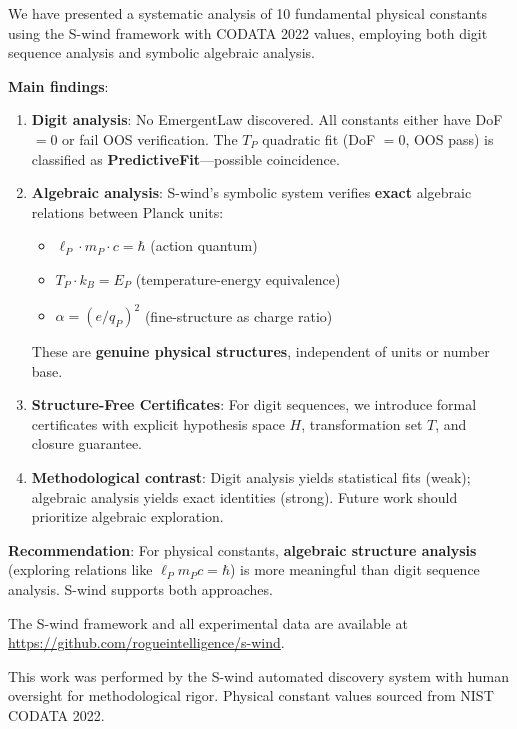 \documentclass[twocolumn,showpacs,preprintnumbers,amsmath,amssymb,prl]{revtex4-2}
\begin{document}
We have presented a systematic analysis of 10 fundamental physical constants using the S-wind framework with CODATA 2022 values, employing both digit sequence analysis and symbolic algebraic analysis.

\textbf{Main findings}:

\begin{enumerate}
    \item \textbf{Digit analysis}: No EmergentLaw discovered. All constants either have DoF $= 0$ or fail OOS verification. The $T_P$ quadratic fit (DoF $= 0$, OOS pass) is classified as \textbf{PredictiveFit}---possible coincidence.
    
    \item \textbf{Algebraic analysis}: S-wind's symbolic system verifies \textbf{exact} algebraic relations between Planck units:
    \begin{itemize}
        \item $\ell_P \cdot m_P \cdot c = \hbar$ (action quantum)
        \item $T_P \cdot k_B = E_P$ (temperature-energy equivalence)
        \item $\alpha = (e/q_P)^2$ (fine-structure as charge ratio)
    \end{itemize}
    These are \textbf{genuine physical structures}, independent of units or number base.
    
    \item \textbf{Structure-Free Certificates}: For digit sequences, we introduce formal certificates with explicit hypothesis space $H$, transformation set $T$, and closure guarantee.
    
    \item \textbf{Methodological contrast}: Digit analysis yields statistical fits (weak); algebraic analysis yields exact identities (strong). Future work should prioritize algebraic exploration.
\end{enumerate}

\textbf{Recommendation}: For physical constants, \textbf{algebraic structure analysis} (exploring relations like $\ell_P m_P c = \hbar$) is more meaningful than digit sequence analysis. S-wind supports both approaches.

The S-wind framework and all experimental data are available at \url{https://github.com/rogueintelligence/s-wind}.

\begin{acknowledgments}
This work was performed by the S-wind automated discovery system with human oversight for methodological rigor. Physical constant values sourced from NIST CODATA 2022.
\end{acknowledgments}
\end{document}
